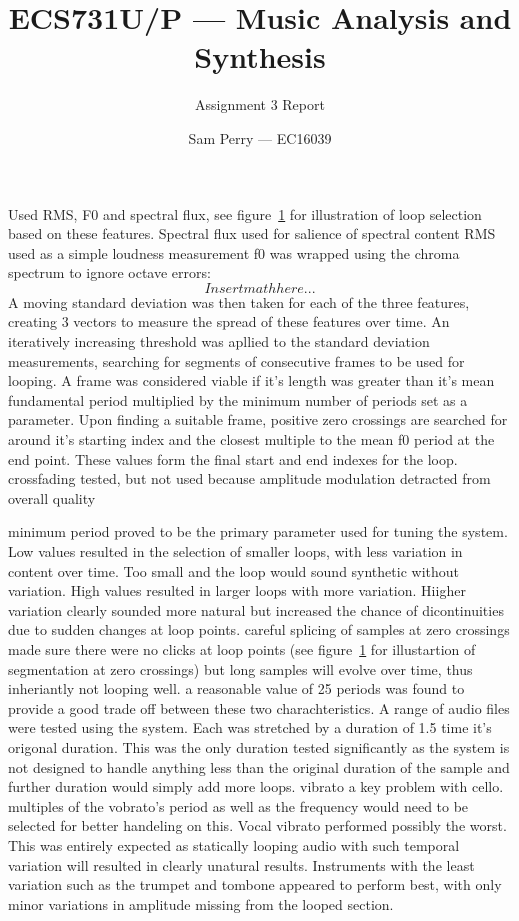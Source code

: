\documentclass[titlepage]{scrartcl}
\begin{document}
\title{ECS731U/P --- Music Analysis and Synthesis}
\subtitle{\LARGE{Assignment 3 Report}}
\author{Sam Perry --- EC16039}

\maketitle

\section{}
Used RMS, F0 and spectral flux, see figure~\ref{} for illustration of loop
selection based on these features.
Spectral flux used for salience of spectral content
RMS used as a simple loudness measurement
f0 was wrapped using the chroma spectrum to ignore octave errors:
$$ Insert math here...$$
A moving standard deviation was then taken for each of the three features,
creating 3 vectors to measure the spread of these features over time.
An iteratively increasing threshold was apllied to the standard deviation
measurements, searching for segments of consecutive frames to be used for
looping. A frame was considered viable if it's length was greater than it's
mean fundamental period multiplied by the minimum number of periods set as a
parameter. 
Upon finding a suitable frame, positive zero crossings are searched for around
it's starting index and the closest multiple to the mean f0 period at the end
point. These values form the final start and end indexes for the loop.
crossfading tested, but not used because amplitude modulation detracted from
overall quality


minimum period proved to be the primary parameter used for tuning the system.
Low values resulted in the selection of smaller loops, with less variation in
content over time. Too small and the loop would sound synthetic without
variation. High values resulted in larger loops with more variation. Hiigher
variation clearly sounded more natural but increased the chance of
dicontinuities due to sudden changes at loop points. careful splicing of
samples at zero crossings made sure there were no clicks at loop points (see
figure~\ref{} for illustartion of segmentation at zero crossings) but
long samples will evolve over time, thus inheriantly not looping well.
a reasonable value of 25 periods was found to provide a good trade off between
these two charachteristics.
A range of audio files were tested using the system. Each was stretched by a
duration of 1.5 time it's origonal duration. This was the only duration tested
significantly as the system is not designed to handle anything less than the
original duration of the sample and further duration would simply add more
loops.
vibrato a key problem with cello. multiples of the vobrato's period as well as
the frequency would need to be selected for better handeling on this. 
Vocal vibrato performed possibly the worst. This was entirely expected as
statically looping audio with such temporal variation will resulted in clearly
unatural results.
Instruments with the least variation such as the trumpet and tombone appeared
to perform best, with only minor variations in amplitude missing from the
looped section.
\end{document}

